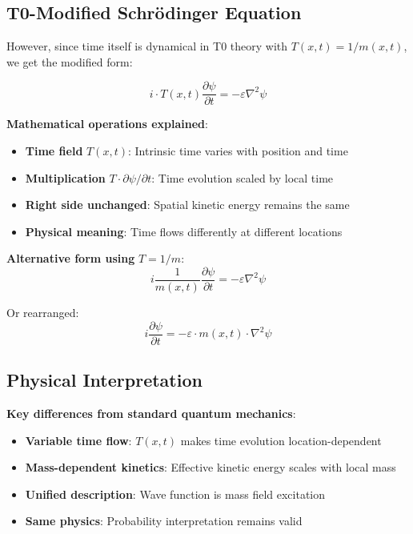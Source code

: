 \documentclass[12pt,a4paper]{article}
\theoremstyle{definition}
\theoremstyle{remark}
\begin{document}
	\subsection{T0-Modified Schrödinger Equation}
	
	However, since time itself is dynamical in T0 theory with $T(x,t) = 1/m(x,t)$, we get the modified form:
	
	\begin{equation}
		\boxed{i \cdot T(x,t) \frac{\partial\psi}{\partial t} = -\varepsilon \nabla^2 \psi}
		\label{eq:t0_modified_schrodinger}
	\end{equation}
	
	\textbf{Mathematical operations explained}:
	\begin{itemize}
		\item \textbf{Time field} $T(x,t)$: Intrinsic time varies with position and time
		\item \textbf{Multiplication} $T \cdot \partial\psi/\partial t$: Time evolution scaled by local time
		\item \textbf{Right side unchanged}: Spatial kinetic energy remains the same
		\item \textbf{Physical meaning}: Time flows differently at different locations
	\end{itemize}
	
	\textbf{Alternative form using} $T = 1/m$:
	\begin{equation}
		i \frac{1}{m(x,t)} \frac{\partial\psi}{\partial t} = -\varepsilon \nabla^2 \psi
		\label{eq:t0_schrodinger_mass}
	\end{equation}
	
	Or rearranged:
	\begin{equation}
		i \frac{\partial\psi}{\partial t} = -\varepsilon \cdot m(x,t) \cdot \nabla^2 \psi
		\label{eq:t0_schrodinger_rearranged}
	\end{equation}
	
	\subsection{Physical Interpretation}
	
	\textbf{Key differences from standard quantum mechanics}:
	\begin{itemize}
		\item \textbf{Variable time flow}: $T(x,t)$ makes time evolution location-dependent
		\item \textbf{Mass-dependent kinetics}: Effective kinetic energy scales with local mass
		\item \textbf{Unified description}: Wave function is mass field excitation
		\item \textbf{Same physics}: Probability interpretation remains valid
	\end{itemize}
	
\end{document}
